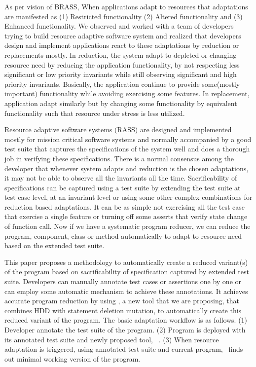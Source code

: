 As per vision of BRASS, When applications adapt to resources that adaptations are manifested as (1) Restricted functionality (2) Altered functionality and (3) Enhanced functionality. We observed and worked with a team of developers trying to build resource adaptive software system and realized that developers design and implement applications react to these adaptations by reduction or replacements mostly. In reduction, the system adapt to depleted or changing resource need by reducing the application functionality, by not respecting less significant or low priority invariants while still observing significant and high priority invariants. Basically, the application continue to provide some(mostly important) functionality while avoiding exercising some features. In replacement, application adapt similarly but by changing some functionality by equivalent functionality such that resource under stress is less utilized.  

Resource adaptive software systems (RASS) are designed and implemented mostly for mission critical software systems and normally accompanied by a good test suite that captures the specifications of the system well and does a thorough job in verifying these specifications. There is a normal consensus among the developer that whenever system adapts and reduction is the chosen adaptations, it may not be able to observe all the invariants all the time. Sacrificability of specifications can be captured using a test suite by extending the test suite at test case level, at an invariant level or using some other complex combinations for reduction based adaptations. It can be as simple not exercising all the test case that exercise a single feature or turning off some asserts that verify state change of function call.  Now if we have a systematic program reducer, we can reduce the program, component, class or method automatically to adapt to resource need based on the extended test suite. 

This paper proposes a methodology to automatically create a reduced variant(s) of the program based on sacrificability of specification captured by extended test suite.  Developers can manually annotate test cases or assertions one by one or can employ some automatic mechanism to achieve these annotations. It achieves accurate program reduction by using \mytool, a new tool that we are proposing,  that combines HDD with statement deletion mutation, to automatically create this reduced variant of the program. The basic adaptation workflow is as follows. (1) Developer annotate the test suite of the program. (2) Program is deployed with its annotated test suite and newly proposed tool, \mytool\ . (3) When resource adaptation is triggered, using annotated test suite and current program, \mytool\ finds out minimal working version of the program.

